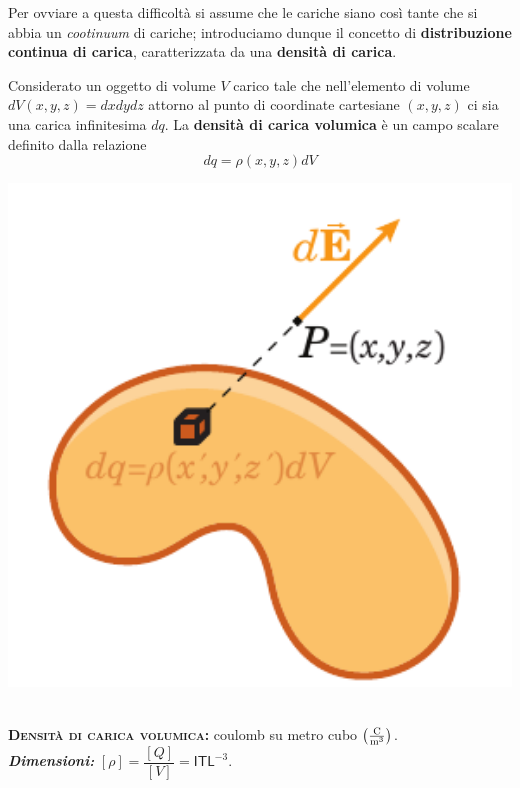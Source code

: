 Per ovviare a questa difficoltà si assume che le cariche siano così tante che si abbia un \textit{cootinuum} di cariche; introduciamo dunque il concetto di \textbf{distribuzione continua di carica}, caratterizzata da una \textbf{densità di carica}.
\begin{define}
\begin{minipage}{0.65\textwidth}
Considerato un oggetto di volume $V$ carico tale che nell'elemento di volume $dV(x,y,z)=dxdydz$ attorno al punto di coordinate cartesiane $(x,y,z)$ ci sia una carica infinitesima $dq$. La \textbf{densità di carica volumica} è un campo scalare definito dalla relazione
	\begin{equation}
		dq=\rho(x,y,z)dV
	\end{equation}
\end{minipage}\hspace{10pt}
\begin{minipage}{0.34\textwidth}
	\begin{center}
		\includegraphics[width=1\textwidth]{images/chp1/chp1density.pdf}
	\end{center}
\end{minipage}
\end{define}
\begin{units}~\\
	\textbf{\textsc{Densità di carica volumica:}} coulomb su metro cubo $\left(\unit[per-mode = fraction]{\coulomb\per\cubic\meter}\right)$.\\
	\textit{\textbf{Dimensioni:}} $[\rho]=\dfrac{[Q]}{[V]}=\mathsf{I}\mathsf{T}\mathsf{L}^{-3}$.
\end{units}
